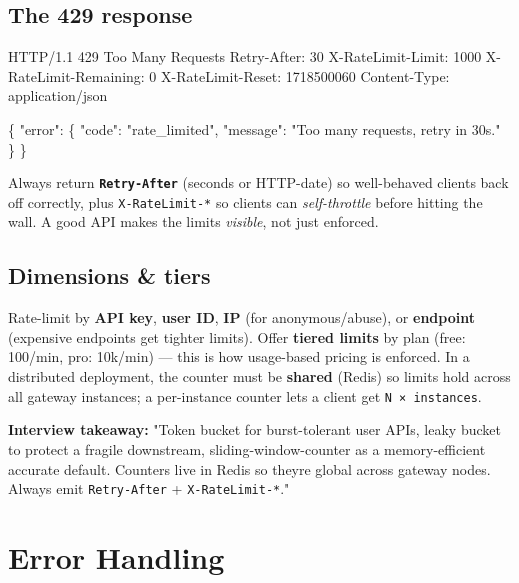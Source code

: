 \documentclass[11pt]{article}
\newenvironment{Shaded}{\begin{snugshade}}{\end{snugshade}}
\newcommand{\NormalTok}[1]{\textcolor[rgb]{0.81,0.81,0.76}{#1}}
\begin{document}
\subsection{The 429 response}\label{the-429-response}


\begin{Shaded}
\begin{Highlighting}[]
\NormalTok{HTTP/1.1 429 Too Many Requests}
\NormalTok{Retry{-}After: 30}
\NormalTok{X{-}RateLimit{-}Limit: 1000}
\NormalTok{X{-}RateLimit{-}Remaining: 0}
\NormalTok{X{-}RateLimit{-}Reset: 1718500060}
\NormalTok{Content{-}Type: application/json}

\NormalTok{\{ "error": \{ "code": "rate\_limited", "message": "Too many requests, retry in 30s." \} \}}
\end{Highlighting}
\end{Shaded}

Always return \textbf{\texttt{Retry-After}} (seconds or HTTP-date) so well-behaved clients back off correctly, plus \texttt{X-RateLimit-*} so clients can \emph{self-throttle} before hitting the wall. A good API makes the limits \emph{visible}, not just enforced.

\subsection{Dimensions \& tiers}\label{dimensions--tiers}

Rate-limit by \textbf{API key}, \textbf{user ID}, \textbf{IP} (for anonymous/abuse), or \textbf{endpoint} (expensive endpoints get tighter limits). Offer \textbf{tiered limits} by plan (free: 100/min, pro: 10k/min) --- this is how usage-based pricing is enforced. In a distributed deployment, the counter must be \textbf{shared} (Redis) so limits hold across all gateway instances; a per-instance counter lets a client get \texttt{N\ ×\ instances}.

\textbf{Interview takeaway:} "Token bucket for burst-tolerant user APIs, leaky bucket to protect a fragile downstream, sliding-window-counter as a memory-efficient accurate default. Counters live in Redis so they\textquotesingle re global across gateway nodes. Always emit \texttt{Retry-After} + \texttt{X-RateLimit-*}."

\section{Error Handling}\label{error-handling}
\end{document}

